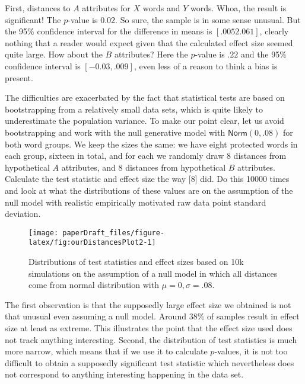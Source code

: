 \documentclass[
  10pt,
  dvipsnames,enabledeprecatedfontcommands]{scrartcl}
\begin{document}
First, distances to \(A\) attributes for \(X\) words and \(Y\) words.
Whoa, the result is significant! The \(p\)-value is \(0.02\). So sure,
the sample is in some sense unusual. But the 95\% confidence interval
for the difference in means is \([.0052 .061]\), clearly nothing that a
reader would expect given that the calculated effect size seemed quite
large. How about the \(B\) attributes? Here the \(p\)-value is \(.22\)
and the 95\% confidence interval is \([-0.03, .009]\), even less of a
reason to think a bias is present.

The difficulties are exacerbated by the fact that statistical tests are
based on bootstrapping from a relatively small data sets, which is quite
likely to underestimate the population variance. To make our point
clear, let us avoid bootstrapping and work with the null generative
model with \(\mathsf{Norm}(0,.08)\) for both word groups. We keep the
sizes the same: we have eight protected words in each group, sixteen in
total, and for each we randomly draw 8 distances from hypothetical \(A\)
attributes, and \(8\) distances from hypothetical \(B\) attributes.
Calculate the test statistic and effect size the way {[}8{]} did. Do
this 10000 times and look at what the distributions of these values are
on the assumption of the null model with realistic empirically motivated
raw data point standard deviation.

\begin{figure}[H]

\begin{center}\texttt{[image: paperDraft\_files/figure-latex/fig:ourDistancesPlot2-1]} \end{center}

\caption{Distributions of test statistics and effect sizes based on 10k simulations on the assumption of a null model in which all distances come from normal distribution with $\mu =0, \sigma = .08$.}
\label{fig:ourDistances}
\end{figure}

The first observation is that the supposedly large effect size we
obtained is not that unusual even assuming a null model. Around 38\% of
samples result in effect size at least as extreme. This illustrates the
point that the effect size used does not track anything interesting.
Second, the distribution of test statistics is much more narrow, which
means that if we use it to calculate \(p\)-values, it is not too
difficult to obtain a supposedly significant test statistic which
nevertheless does not correspond to anything interesting happening in
the data set.
\end{document}
